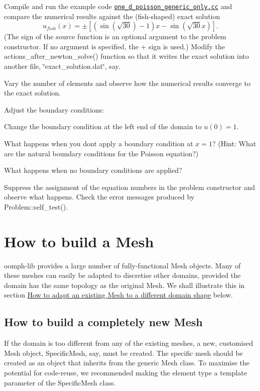 \begin{DoxyItemize}
\item Compile and run the example code \href{../../../demo_drivers/poisson/one_d_poisson_generic_only/one_d_poisson_generic_only.cc}{\tt one\+\_\+d\+\_\+poisson\+\_\+generic\+\_\+only.\+cc} and compare the numerical results against the (fish-\/shaped) exact solution \[ u_{fish}(x) = \pm \left[ \left(\sin(\sqrt{30})-1\right) x - \sin(\sqrt{30} x)\right]. \] (The sign of the source function is an optional argument to the problem constructor. If no argument is specified, the + sign is used.) Modify the {\ttfamily actions\+\_\+after\+\_\+newton\+\_\+solve()} function so that it writes the exact solution into another file, \char`\"{}exact\+\_\+solution.\+dat\char`\"{}, say.
\item Vary the number of elements and observe how the numerical results converge to the exact solution.
\item Adjust the boundary conditions\+:
\begin{DoxyItemize}
\item Change the boundary condition at the left end of the domain to $ u(0)=1$.
\item What happens when you don\textquotesingle{}t apply a boundary condition at $ x=1 $? (Hint\+: What are the natural boundary conditions for the Poisson equation?)
\item What happens when no boundary conditions are applied?
\end{DoxyItemize}
\item Suppress the assignment of the equation numbers in the problem constructor and observe what happens. Check the error messages produced by {\ttfamily Problem\+::self\+\_\+test()}.
\end{DoxyItemize}

 

\hypertarget{index_mesh}{}\section{How to build a Mesh}\label{index_mesh}
{\ttfamily oomph-\/lib} provides a large number of fully-\/functional {\ttfamily Mesh} objects. Many of these meshes can easily be adapted to discretise other domains, provided the domain has the same topology as the original {\ttfamily Mesh}. We shall illustrate this in section \hyperlink{index_distorted_mesh}{How to adapt an existing Mesh to a different domain shape} below.\hypertarget{index_new_mesh}{}\subsection{How to build a completely new Mesh}\label{index_new_mesh}
If the domain is too different from any of the existing meshes, a new, customised {\ttfamily Mesh} object, {\ttfamily Specific\+Mesh}, say, must be created. The specific mesh should be created as an object that inherits from the generic {\ttfamily Mesh} class. To maximise the potential for code-\/reuse, we recommended making the element type a template parameter of the {\ttfamily Specific\+Mesh} class.


